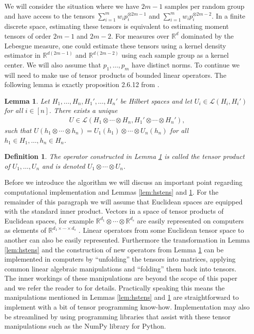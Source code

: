 \documentclass[aos,preprint]{imsart}
\def\rn{\mathbb{R}}
\def\l{\left}
\def\r{\right}
\theoremstyle{plain}
\newtheorem{lem}{Lemma}[section]
\theoremstyle{defintion}
\newtheorem{defin}{Definition}[section]
\begin{document}
We will consider the situation where we have $2m-1$ samples per random group and have access to the tensors $\sum_{i=1}^m w_i p_i^{\otimes 2m-1}$ and $\sum_{i=1}^m w_i p_i^{\otimes 2m-2}$. In a finite discrete space, estimating these tensors is equivalent to estimating moment tensors of order $2m-1$ and $2m-2$. For measures over $\rn^d$ dominated by the Lebesgue measure, one could estimate these tensors using a kernel density estimator in $\rn^{d(2m-1)}$ and $\rn^{d(2m-2)}$ using each sample group as a kernel center. We will also assume that $p_1,\ldots,p_m$ have distinct norms. To continue we will need to make use of tensor products of bounded linear operators. The following lemma is exactly proposition 2.6.12 from \cite{kadison83}.
\begin{lem} \label{lem:hsprod}
	Let $H_1,\ldots,H_n,H_1',\ldots,H_n'$ be Hilbert spaces and let $U_i \in \mathcal{L}\l(H_i,H_i'\r)$ for all $i \in \left[ n \right]$. There exists a unique 
	\begin{align*}
		U \in \mathcal{L}\left( H_1\otimes \cdots \otimes H_n,H_1'\otimes \cdots \otimes H_n' \right),
	\end{align*}
	such that $U\left( h_1\otimes \cdots \otimes h_n \right) = U_1\left( h_1 \right) \otimes \cdots \otimes U_n\left( h_n \right)$ for all $h_1 \in H_1, \ldots, h_n \in H_n$.
\end{lem}
\begin{defin}\label{def:prodop}
	The operator constructed in Lemma \ref{lem:hsprod} is called the {\em tensor product of $U_1,\ldots,U_n$} and is denoted $U_1\otimes \cdots \otimes U_n$.
\end{defin}

Before we introduce the algorithm we will discuss an important point regarding computational implementation and Lemmas \ref{lem:hstens} and \ref{lem:hsprod}. For the remainder of this paragraph we will assume that Euclidean spaces are equipped with the standard inner product. Vectors in a space of tensor products of Euclidean spaces, for example $\rn^{d_1}\otimes \cdots \otimes \rn^{d_s}$ are easily represented on computers as elements of $\rn^{d_1\times \cdots \times d_s}$ \cite{symtensorrank}. Linear operators from some Euclidean tensor space to another can also be easily represented. Furthermore the transformation in Lemma \ref{lem:hstens} and the construction of new operators from Lemma \ref{lem:hsprod} can be implemented in computers by  ``unfolding'' the tensors into matrices, applying common linear algebraic manipulations and ``folding'' them back into tensors. The inner workings of these manipulations are beyond the scope of this paper and we refer the reader to \cite{golub1996} for details. Practically speaking this means the manipulations mentioned in Lemmas \ref{lem:hstens} and \ref{lem:hsprod} are straightforward to implement with a bit of tensor programming know-how. Implementation may also be streamlined by using programming libraries that assist with these tensor manipulations such as the NumPy library for Python.
\end{document}

